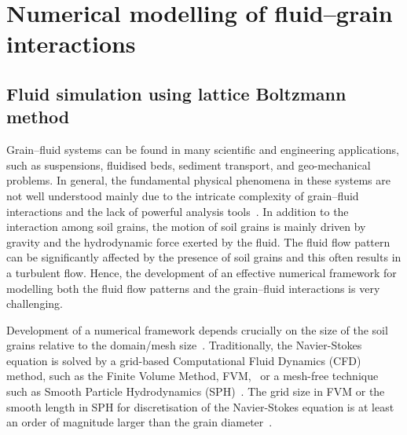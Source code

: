\chapter{Numerical modelling of fluid–grain interactions}

\ifpdf
    \graphicspath{{Chapter5/figs/raster/}{Chapter5/figs/pdf/}{Chapter5/figs/}}
\else
    \graphicspath{{Chapter5/figs/vector/}{Chapter5/figs/}}
\fi


\section{Fluid simulation using lattice Boltzmann method}

Grain--fluid systems can be found in many scientific and engineering 
applications, such as suspensions, fluidised beds, sediment transport, and 
geo-mechanical problems. In general, the fundamental physical phenomena in 
these systems are not well understood mainly due to the intricate complexity of 
grain--fluid interactions and the lack of powerful analysis 
tools~\citep{Han2007b}. In addition to the interaction among soil grains, the 
motion of soil grains is mainly driven by gravity and the hydrodynamic force 
exerted by the fluid. The fluid flow pattern can be significantly 
affected by the presence of soil grains and this often results in a turbulent 
flow. Hence, the development of an effective numerical framework for modelling 
both the fluid flow patterns and the grain--fluid interactions is very 
challenging.

Development of a numerical framework depends crucially on the size of the soil 
grains relative to the domain/mesh size~\citep{Feng2007}. Traditionally, the 
Navier-Stokes equation is solved by a grid-based Computational Fluid Dynamics 
(CFD) method, such as the Finite Volume Method, FVM,~\citep{Capecelatro2013} or 
a mesh-free technique such as Smooth Particle Hydrodynamics
(SPH)~\citep{Sun2013}. 
The grid size in FVM or the smooth length in SPH for discretisation of 
the Navier-Stokes equation is at least an order of magnitude larger than the 
grain diameter~\citep{Xiong2014}. 

